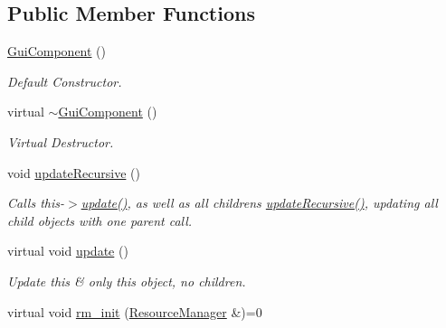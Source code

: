 \subsection*{Public Member Functions}
\begin{DoxyCompactItemize}
\item 
\mbox{\label{class_gui_component_a39e1734c781ba4ac8c87da58e0a10ebd}} 
\mbox{\hyperlink{class_gui_component_a39e1734c781ba4ac8c87da58e0a10ebd}{Gui\+Component}} ()
\begin{DoxyCompactList}\small\item\em Default Constructor. \end{DoxyCompactList}\item 
\mbox{\label{class_gui_component_ad94998891efad935b4422cf1da69e4af}} 
virtual \mbox{\hyperlink{class_gui_component_ad94998891efad935b4422cf1da69e4af}{$\sim$\+Gui\+Component}} ()
\begin{DoxyCompactList}\small\item\em Virtual Destructor. \end{DoxyCompactList}\item 
\mbox{\label{class_gui_component_ac58e20a01f67cf605b069ef853dfab66}} 
void \mbox{\hyperlink{class_gui_component_ac58e20a01f67cf605b069ef853dfab66}{update\+Recursive}} ()
\begin{DoxyCompactList}\small\item\em Calls this-\/$>$\mbox{\hyperlink{class_gui_component_adacaca1d0604e6b93cb22962e60cc285}{update()}}, as well as all childrens\textquotesingle{} \mbox{\hyperlink{class_gui_component_ac58e20a01f67cf605b069ef853dfab66}{update\+Recursive()}}, updating all child objects with one parent call. \end{DoxyCompactList}\item 
virtual void \mbox{\hyperlink{class_gui_component_adacaca1d0604e6b93cb22962e60cc285}{update}} ()
\begin{DoxyCompactList}\small\item\em Update this \& only this object, no children. \end{DoxyCompactList}\item 
\mbox{\label{class_gui_component_a7c42118c5d2ba58ca02a1ea5ff81fe78}} 
virtual void \mbox{\hyperlink{class_gui_component_a7c42118c5d2ba58ca02a1ea5ff81fe78}{rm\+\_\+init}} (\mbox{\hyperlink{class_resource_manager}{Resource\+Manager}} \&)=0

\end{DoxyCompactItemize}
